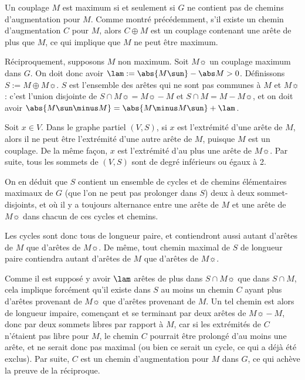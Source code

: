  \SEP{}
    Un couplage $M$ est maximum si et seulement si $G$ ne contient pas de chemins d'augmentation pour $M$.
 \SEP\jpreuve
    Comme montré précédemment, s'il existe un chemin d'augmentation $C$ pour $M$, alors $C \oplus M$ est un couplage contenant une arête de plus que $M$, ce qui implique que $M$ ne peut être maximum.
    
    Réciproquement, supposons $M$ non maximum. Soit $M\sun$ un couplage maximum dans $G$. On doit donc avoir $\lam := \abs {M\sun} - \abs M > 0$. Définissons $S := M \oplus M\sun$. $S$ est l'ensemble des arêtes qui ne sont pas communes à $M$ et $M\sun$ : c'est l'union disjointe de $S \cap M\sun = M\sun \minus M$ et $S \cap M = M \minus M\sun$, et on doit avoir $\abs{M\sun \minus M} = \abs{M \minus M\sun}+\lam$.
    
    Soit $x \in V$. Dans le graphe partiel $(V, S)$, si $x$ est l'extrémité d'une arête de $M$, alors il ne peut être l'extrémité d'une autre arête de $M$, puisque $M$ est un couplage. De la même façon, $x$ est l'extrémité d'au plus une arête de $M\sun$. Par suite, tous les sommets de $(V,S)$ sont de degré inférieurs ou égaux à 2.
    
    On en déduit que $S$ contient un ensemble de cycles et de chemins élémentaires maximaux de $G$ (que l'on ne peut pas prolonger dans $S$) deux à deux sommet-disjoints, et où il y a toujours alternance entre une arête de $M$ et une arête de $M\sun$ dans chacun de ces cycles et chemins.
    
    Les cycles sont donc tous de longueur paire, et contiendront aussi autant d'arêtes de $M$ que d'arêtes de $M\sun$. De même, tout chemin maximal de $S$ de longueur paire contiendra autant d'arêtes de $M$ que d'arêtes de $M\sun$.
    
    Comme il est supposé y avoir $\lam$ arêtes de plus dans $S \cap M\sun$ que dans $S \cap M$, cela implique forcément qu'il existe dans $S$ au moins un chemin $C$ ayant plus d'arêtes provenant de $M\sun$ que d'arêtes provenant de $M$. Un tel chemin est alors de longueur impaire, començant et se terminant par deux arêtes de $M\sun \minus M$, donc par deux sommets libres par rapport à $M$, car si les extrémités de $C$ n'étaient pas libre pour $M$, le chemin $C$ pourrait être prolongé d'au moins une arête, et ne serait donc pas maximal (ou bien ce serait un cycle, ce qui a déjà été exclus). Par suite, $C$ est un chemin d'augmentation pour $M$ dans $G$, ce qui achève la preuve de la réciproque.
    
